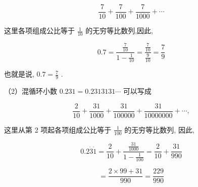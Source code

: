 \documentclass[lang=cn,newtx,10pt,scheme=chinese]{elegantbook}
\begin{document}
\[
\frac{7}{10} + \frac{7}{100} + \frac{7}{1000} + \cdots
\]

这里各项组成公比等于 \(\frac{1}{10}\) 的无穷等比数列,因此,

\[
{0.7} = \frac{\frac{7}{10}}{1 - \frac{1}{10}} = \frac{\frac{7}{10}}{\frac{9}{10}} = \frac{7}{9}
\]

也就是说, \({0.7} = \frac{7}{9}\) .

（2）混循环小数 \({0.231} = {0.2313131}\cdots\) 可以写成

\[
\frac{2}{10} + \frac{31}{1000} + \frac{31}{100000} + \frac{31}{10000000} + \cdots ,
\]

这里从第 2 项起各项组成公比等于 \(\frac{1}{100}\) 的无穷等比数列, 因此,

\[
{0.2}\dot{3}\dot{1} = \frac{2}{10} + \frac{\frac{31}{1000}}{1 - \frac{1}{100}} = \frac{2}{10} + \frac{31}{990}
\]

\[
= \frac{2 \times {99} + {31}}{990} = \frac{229}{990}
\]
\end{document}

